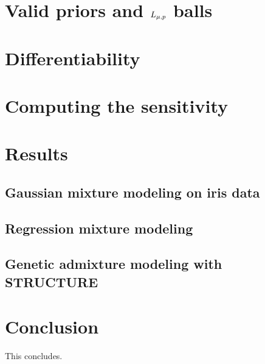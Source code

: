 \documentclass[11pt]{article}
\begin{document}
\section{Valid priors and ${L_{\mu,p}}$ balls}


\section{Differentiability}


% 


\section{Computing the sensitivity}


\section{Results}


    \subsection{Gaussian mixture modeling on iris data}
    

    \subsection{Regression mixture modeling}
    

    \subsection{Genetic admixture modeling with STRUCTURE}
    

\section{Conclusion}
This concludes.
\end{document}
